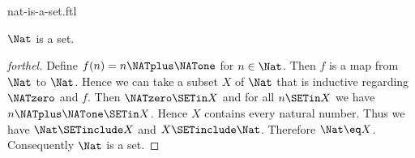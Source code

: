 \documentclass{naproche-library}
\begin{document}
\begin{smodule}[title=The Natural Numbers Form a Set]{nat-is-a-set.ftl}

\begin{proposition}[forthel,id=ARITHMETIC_07_4685510236547454]
  $\Nat$ is a set.
\end{proposition}
\begin{proof}[forthel]
  Define $f(n) = n \NATplus \NATone$ for $n \in \Nat$.
  Then $f$ is a map from $\Nat$ to $\Nat$.
  Hence we can take a subset $X$ of $\Nat$ that is inductive regarding
  $\NATzero$ and $f$.
  Then $\NATzero \SETin X$ and for all $n \SETin X$ we have $n \NATplus \NATone \SETin X$.
  Hence $X$ contains every natural number.
  Thus we have $\Nat \SETinclude X$ and $X \SETinclude \Nat$.
  Therefore $\Nat \eq X$.
  Consequently $\Nat$ is a set.
\end{proof}
\end{smodule}
\end{document}
